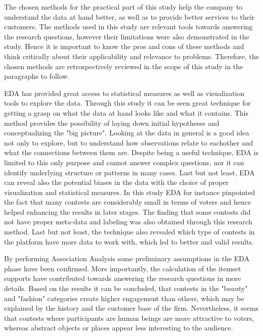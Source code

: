 The chosen methods for the practical part of this study help the company to understand the data at hand better, as well as to provide better services to their customers. The methods used in this study are relevant tools towards answering the research questions, however their limitations were also demonstrated in the study. Hence it is important to know the pros and cons of these methods and think critically about their applicability and relevance to problems. Therefore, the chosen methods are retrospectively reviewed in the scope of this study in the paragraphs to follow.

EDA has provided great access to statistical measures as well as visualization tools to explore the data. Through this study it can be seen great technique for getting a grasp on what the data at hand looks like and what it contains. This method provides the possibility of laying down initial hypotheses and conceptualizing the "big picture". Looking at the data in general is a good idea not only to explore, but to understand how observations relate to eachother and what the connections between them are. Despite being a useful technique, EDA is limited to this only purpose and cannot answer complex questions, nor it can identify underlying structure or patterns in many cases. Last but not least, EDA can reveal also the potential biases in the data with the choice of proper visualization and statistical measures. In this study EDA for instance pinpointed the fact that many contests are considerably small in terms of voters and hence helped enhancing the results in later stages. The finding that some contests did not have proper meta-data and labeling was also obtained through this research method. Last but not least, the technique also revealed which type of contests in the platform have more data to work with, which led to better and valid results. 

By performing Association Analysis some preliminary assumptions in the EDA phase have been confirmed. More importantly, the calculation of the itemset supports have contributed towards answering the research questions in more details. Based on the results it can be concluded, that contests in the "beauty" and "fashion" categories create higher engagement than others, which may be explained by the history and the customer base of the firm. Nevertheless, it seems that contests where participants are human beings are more attractive to voters, whereas abstract objects or places appear less interesting to the audience. 

